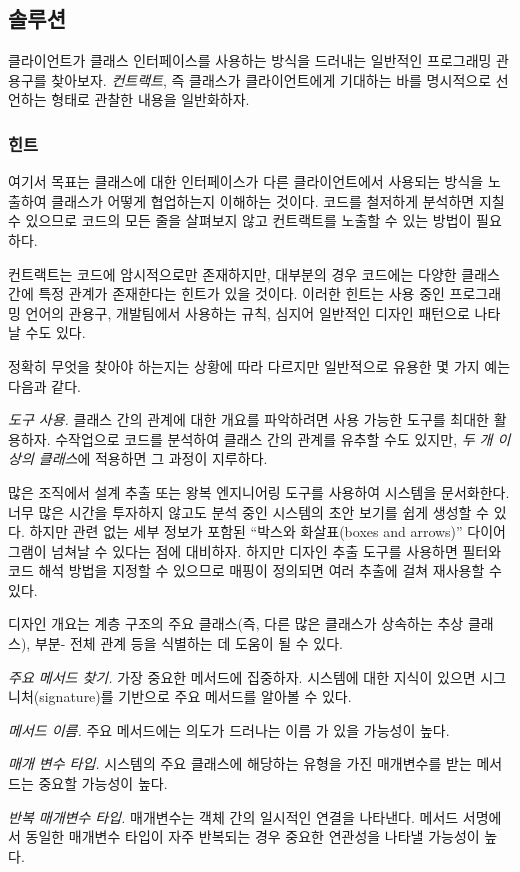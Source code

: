 \documentclass[a4paper,10pt,twoside]{book}
\begin{document}
\subsection*{솔루션}

클라이언트가 클래스 인터페이스를 사용하는 방식을 드러내는 일반적인 프로그래밍 관용구를 찾아보자. \emph{컨트랙트}, 즉 클래스가 클라이언트에게 기대하는 바를 명시적으로 선언하는 형태로 관찰한 내용을 일반화하자.

\subsubsection*{힌트}

여기서 목표는 클래스에 대한 인터페이스가 다른 클라이언트에서 사용되는 방식을 노출하여 클래스가 어떻게 협업하는지 이해하는 것이다. 코드를 철저하게 분석하면 지칠 수 있으므로 코드의 모든 줄을 살펴보지 않고 컨트랙트를 노출할 수 있는 방법이 필요하다.

컨트랙트는 코드에 암시적으로만 존재하지만, 대부분의 경우 코드에는 다양한 클래스 간에 특정 관계가 존재한다는 힌트가 있을 것이다. 이러한 힌트는 사용 중인 프로그래밍 언어의 관용구, 개발팀에서 사용하는 규칙, 심지어 일반적인 디자인 패턴으로 나타날 수도 있다. 

정확히 무엇을 찾아야 하는지는 상황에 따라 다르지만 일반적으로 유용한 몇 가지 예는 다음과 같다.

\noindent
\emph{도구 사용.}
클래스 간의 관계에 대한 개요를 파악하려면 사용 가능한 도구를 최대한 활용하자. 수작업으로 코드를 분석하여 클래스 간의 관계를 유추할 수도 있지만, \emph{두 개 이상의 클래스}에 적용하면 그 과정이 지루하다.

많은 조직에서 설계 추출 또는 왕복 엔지니어링 도구를 사용하여 시스템을 문서화한다. 너무 많은 시간을 투자하지 않고도 분석 중인 시스템의 초안 보기를 쉽게 생성할 수 있다. 하지만 관련 없는 세부 정보가 포함된 ``박스와 화살표(boxes and arrows)'' 다이어그램이 넘쳐날 수 있다는 점에 대비하자. 하지만 디자인 추출 도구를 사용하면 필터와 코드 해석 방법을 지정할 수 있으므로 매핑이 정의되면 여러 추출에 걸쳐 재사용할 수 있다.

디자인 개요는 계층 구조의 주요 클래스(즉, 다른 많은 클래스가 상속하는 추상 클래스), 부분- 전체 관계 등을 식별하는 데 도움이 될 수 있다.

\noindent
\emph{주요 메서드 찾기.}
가장 중요한 메서드에 집중하자. 시스템에 대한 지식이 있으면 시그니처(signature)를 기반으로 주요 메서드를 알아볼 수 있다.

\begin{bulletlist}
\item \emph{메서드 이름.}
주요 메서드에는 의도가 드러나는 이름 \cite{Beck97a}가 있을 가능성이 높다.

\item \emph{매개 변수 타입.}
시스템의 주요 클래스에 해당하는 유형을 가진 매개변수를 받는 메서드는 중요할 가능성이 높다.

\item \emph{반복 매개변수 타입.}
매개변수는 객체 간의 일시적인 연결을 나타낸다. 메서드 서명에서 동일한 매개변수 타입이 자주 반복되는 경우 중요한 연관성을 나타낼 가능성이 높다.
\end{bulletlist}
\end{document}
